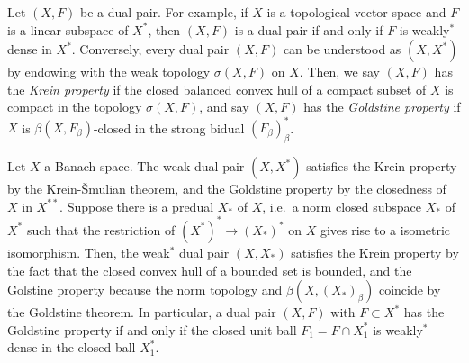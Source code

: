 \documentclass{../../small}
\begin{document}
\begin{defn}
Let $(X,F)$ be a dual pair.
For example, if $X$ is a topological vector space and $F$ is a linear subspace of $X^*$, then $(X,F)$ is a dual pair if and only if $F$ is weakly$^*$ dense in $X^*$.
Conversely, every dual pair $(X,F)$ can be understood as $(X,X^*)$ by endowing with the weak topology $\sigma(X,F)$ on $X$.
Then, we say $(X,F)$ has the \emph{Krein property} if the closed balanced convex hull of a compact subset of $X$ is compact in the topology $\sigma(X,F)$, and say $(X,F)$ has the \emph{Goldstine property} if $X$ is $\beta(X,F_\beta)$-closed in the strong bidual $(F_\beta)^*_\beta$.
\end{defn}
\begin{rmk*}
Let $X$ a Banach space.
The weak dual pair $(X,X^*)$ satisfies the Krein property by the Krein-\v Smulian theorem, and the Goldstine property by the closedness of $X$ in $X^{**}$.
Suppose there is a predual $X_*$ of $X$, i.e.~a norm closed subspace $X_*$ of $X^*$ such that the restriction of $(X^*)^*\to(X_*)^*$ on $X$ gives rise to a isometric isomorphism.
Then, the weak$^*$ dual pair $(X,X_*)$ satisfies the Krein property by the fact that the closed convex hull of a bounded set is bounded, and the Golstine property because the norm topology and $\beta(X,(X_*)_\beta)$ coincide by the Goldstine theorem.
In particular, a dual pair $(X,F)$ with $F\subset X^*$ has the Goldstine property if and only if the closed unit ball $F_1=F\cap X^*_1$ is weakly$^*$ dense in the closed ball $X^*_1$.
\end{rmk*}
\end{document}
